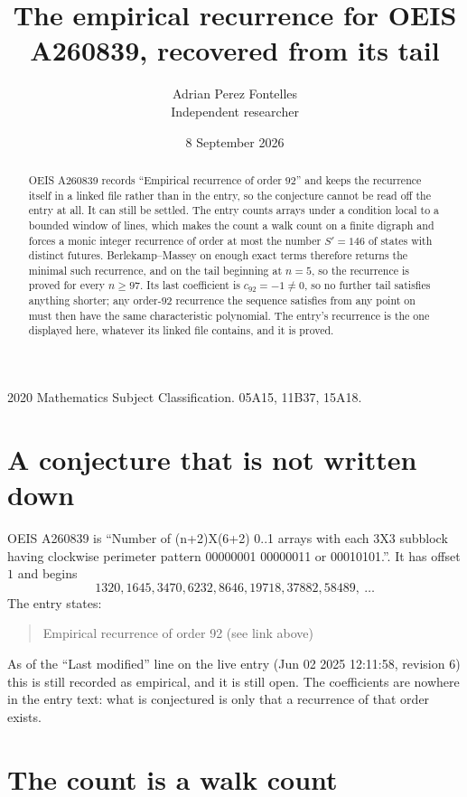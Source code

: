 \documentclass[11pt,a4paper]{article}
\title{The empirical recurrence for OEIS A260839, recovered from its tail}
\author{Adrian Perez Fontelles\\ \small Independent researcher}
\date{8 September 2026}
\theoremstyle{plain}
\theoremstyle{definition}
\begin{document}
\maketitle

\begin{abstract}
OEIS A260839 records ``Empirical recurrence of order $92$'' and keeps the recurrence itself in
a linked file rather than in the entry, so the conjecture cannot be read off the entry at all.
It can still be settled. The entry counts arrays under a condition local to a bounded window of
lines, which makes the count a walk count on a finite digraph and forces a monic integer
recurrence of order at most the number $S'=146$ of states with distinct futures. Berlekamp--Massey on
enough exact terms therefore returns the minimal such recurrence, and on the tail beginning at $n=5$, so the recurrence is proved for every $n\ge97$.
Its last coefficient is $c_{92}=-1\neq0$, so no further tail satisfies anything
shorter; any order-$92$ recurrence the sequence satisfies from any point on must then have
the same characteristic polynomial. The entry's recurrence is the one displayed here, whatever
its linked file contains, and it is proved.
\end{abstract}

\noindent\small 2020 Mathematics Subject Classification. 05A15, 11B37, 15A18.\normalsize

\section{A conjecture that is not written down}

OEIS A260839 is ``Number of (n+2)X(6+2) 0..1 arrays with each 3X3 subblock having clockwise perimeter pattern 00000001 00000011 or 00010101.''. It has offset $1$ and begins
\[
1320, 1645, 3470, 6232, 8646, 19718, 37882, 58489,\ \dots
\]
The entry states:
\begin{quote}
Empirical recurrence of order 92 (see link above)
\end{quote}
As of the ``Last modified'' line on the live entry (Jun 02 2025 12:11:58, revision 6)
this is still recorded as empirical, and it is still open. The coefficients are nowhere in the
entry text: what is conjectured is only that a recurrence of that order exists.

\section{The count is a walk count}
\end{document}
